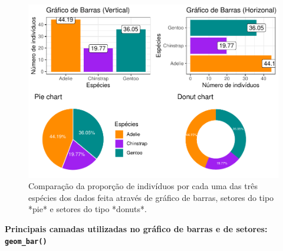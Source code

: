 \documentclass[
]{article}
\begin{document}
\begin{figure}
\includegraphics[width=1\linewidth]{epr_files/figure-latex/fig-prop-1} \caption{Comparação da proporção de indivíduos por cada uma das três espécies dos dados feita através de gráfico de barras, setores do tipo *pie* e setores do tipo *donuts*.}\label{fig:fig-prop}
\end{figure}

\textbf{Principais camadas utilizadas no gráfico de barras e de setores: \texttt{geom\_bar()}}
\end{document}
